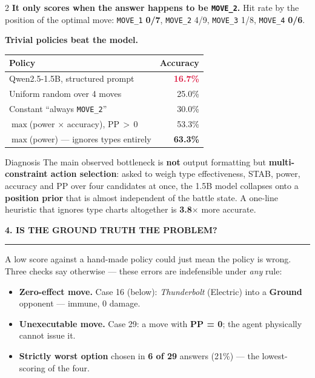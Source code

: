 \documentclass[9pt,a4paper]{extarticle}
\newcommand{\heading}[1]{%
  \par\vspace{1.4mm}\noindent
  {\color{navy}\bfseries\small\MakeUppercase{#1}}
  \par\vspace{0.7mm}\noindent
  {\color{amber}\rule{\linewidth}{1.1pt}}
  \par\vspace{0.6mm}\noindent\ignorespaces}
\begin{document}
\begin{multicols}{2}
\textbf{It only scores when the answer happens to be \texttt{MOVE\_2}.} Hit rate by the position of the optimal move: \texttt{MOVE\_1} \textbf{0/7}, \texttt{MOVE\_2} 4/9, \texttt{MOVE\_3} 1/8, \texttt{MOVE\_4} \textbf{0/6}.

\textbf{Trivial policies beat the model.}
\vspace{0.8mm}

{\centering
\begin{tabular}{@{}lr@{}}
\toprule
\textbf{Policy} & \textbf{Accuracy}\\
\midrule
Qwen2.5-1.5B, structured prompt   & \textcolor{crimson}{\textbf{16.7\%}}\\
Uniform random over 4 moves       & 25.0\%\\
Constant ``always \texttt{MOVE\_2}'' & 30.0\%\\
$\max$(power $\times$ accuracy), PP\,$>$\,0 & 53.3\%\\
$\max$(power) --- ignores types entirely & \textbf{63.3\%}\\
\bottomrule
\end{tabular}\par}
\vspace{1.4mm}

\begin{keybox}{Diagnosis}
The main observed bottleneck is \textbf{not} output formatting but \textbf{multi-constraint action selection}: asked to weigh type effectiveness, STAB, power, accuracy and PP over four candidates at once, the 1.5B model collapses onto a \textbf{position prior} that is almost independent of the battle state. A one-line heuristic that ignores type charts altogether is \textbf{3.8$\times$} more accurate.
\end{keybox}

\heading{4. Is the ground truth the problem?}
A low score against a hand-made policy could just mean the policy is wrong. Three checks say otherwise --- these errors are indefensible under \emph{any} rule:
\begin{itemize}
\item \textbf{Zero-effect move.} Case 16 (below): \emph{Thunderbolt} (Electric) into a \textbf{Ground} opponent --- immune, 0 damage.
\item \textbf{Unexecutable move.} Case 29: a move with \textbf{PP = 0}; the agent physically cannot issue it.
\item \textbf{Strictly worst option} chosen in \textbf{6 of 29} answers (21\%) --- the lowest-scoring of the four.
\end{itemize}


\end{multicols}
\end{document}

